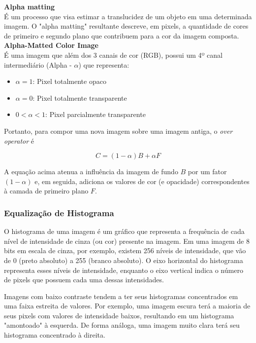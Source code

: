 \documentclass[12pt, a4paper]{article}
\begin{document}
\noindent \textbf{Alpha matting} \\

É um processo que visa estimar a translucidez de um objeto em uma determinada imagem. O "alpha matting" resultante descreve, em pixels, a quantidade de cores de primeiro e segundo plano que contribuem para a cor da imagem composta. \cite{germer2020fastmultilevelforegroundestimation} \\

\noindent \textbf{Alpha-Matted Color Image} \\

É uma imagem que além dos 3 canais de cor (RGB), possui um 4º canal intermediário (Alpha - $\alpha$) que representa:
\begin{itemize}
    \item $\alpha = 1$: Pixel totalmente opaco
    \item $\alpha = 0$: Pixel totalmente transparente
    \item $0 < \alpha < 1$: Pixel parcialmente transparente
\end{itemize}

Portanto, para compor uma nova imagem sobre uma imagem antiga, o \textit{over operator} é

\[
C = (1-\alpha) B + \alpha F
\]

A equação acima atenua a influência da imagem de fundo $B$ por um fator $(1 - \alpha)$ e,
em seguida, adiciona os valores de cor (e opacidade) correspondentes à camada de primeiro plano $F$.

\subsubsection{Equalização de Histograma}

O histograma de uma imagem é um gráfico que representa a frequência de cada nível de intensidade de cinza (ou cor) presente na imagem. Em uma imagem de 8 bits em escala de cinza, por exemplo, existem 256 níveis de intensidade, que vão de 0 (preto absoluto) a 255 (branco absoluto). O eixo horizontal do histograma representa esses níveis de intensidade, enquanto o eixo vertical indica o número de pixels que possuem cada uma dessas intensidades.

Imagens com baixo contraste tendem a ter seus histogramas concentrados em uma faixa estreita de valores. Por exemplo, uma imagem escura terá a maioria de seus pixels com valores de intensidade baixos, resultando em um histograma "amontoado" à esquerda. De forma análoga, uma imagem muito clara terá seu histograma concentrado à direita.
\end{document}
